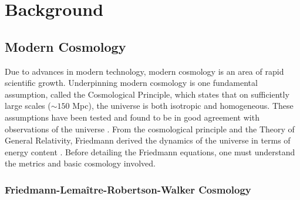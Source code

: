 \documentclass[titlesmallcaps, examinerscopy, copyrightpage]{uqthesis}
\begin{document}
\chapter{Background}
\label{ch:back}

\section{Modern Cosmology}

Due to advances in modern technology, modern cosmology is an area of rapid scientific growth. Underpinning modern cosmology is one fundamental assumption, called the Cosmological Principle, which states that on sufficiently large scales ($\sim 150$ Mpc), the universe is both isotropic and homogeneous. These assumptions have been tested and found to be in good agreement with observations of the universe \citep{Lahav2001,HansenBanday2004, HoggEisenstein2005, ScrimgeourDavis2012,SchwarzBacon2015}. From the cosmological principle and the Theory of General Relativity, Friedmann derived the dynamics of the universe in terms of energy content \citep{RydenPeterson2010}. Before detailing the Friedmann equations, one must understand the metrics and basic cosmology involved.

\subsection{Friedmann-Lema\^itre-Robertson-Walker Cosmology} \label{sec:frw}
\end{document}
